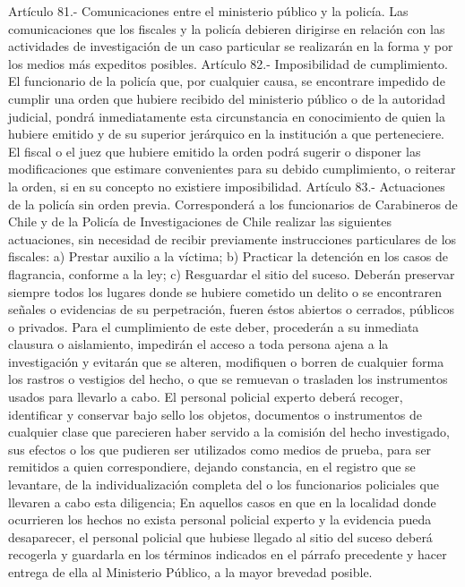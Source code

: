     Artículo 81.- Comunicaciones entre el ministerio público y la policía. Las comunicaciones que los fiscales y la policía debieren dirigirse en relación con las actividades de investigación de un caso particular se realizarán en la forma y por los medios más expeditos posibles.
    Artículo 82.- Imposibilidad de cumplimiento. El funcionario de la policía que, por cualquier causa, se encontrare impedido de cumplir una orden que hubiere recibido del ministerio público o de la autoridad judicial, pondrá inmediatamente esta circunstancia en conocimiento de quien la hubiere emitido y de su superior jerárquico en la institución a que perteneciere.
    El fiscal o el juez que hubiere emitido la orden podrá sugerir o disponer las modificaciones que estimare convenientes para su debido cumplimiento, o reiterar la orden, si en su concepto no existiere imposibilidad.
    Artículo 83.- Actuaciones de la policía sin orden previa. Corresponderá a los funcionarios de Carabineros de Chile y de la Policía de Investigaciones de Chile realizar las siguientes actuaciones, sin necesidad de recibir previamente instrucciones particulares de los fiscales:
    a) Prestar auxilio a la víctima;
    b) Practicar la detención en los casos de flagrancia, conforme a la ley;
    c) Resguardar el sitio del suceso. Deberán preservar siempre todos los lugares donde se hubiere cometido un delito o se encontraren señales o evidencias de su perpetración, fueren éstos abiertos o cerrados, públicos o privados. Para el cumplimiento de este deber, procederán a su inmediata clausura o aislamiento, impedirán el acceso a toda persona ajena a la investigación y evitarán que se alteren, modifiquen o borren de cualquier forma los rastros o vestigios del hecho, o que se remuevan o trasladen los instrumentos usados para llevarlo a cabo.
    El personal policial experto deberá recoger, identificar y conservar bajo sello los objetos, documentos o instrumentos de cualquier clase que parecieren haber servido a la comisión del hecho investigado, sus efectos o los que pudieren ser utilizados como medios de prueba, para ser remitidos a quien correspondiere, dejando constancia, en el registro que se levantare, de la individualización completa del o los funcionarios policiales que llevaren a cabo esta diligencia;
    En aquellos casos en que en la localidad donde ocurrieren los hechos no exista personal policial experto y la evidencia pueda desaparecer, el personal policial que hubiese llegado al sitio del suceso deberá recogerla y guardarla en los términos indicados en el párrafo precedente y hacer entrega de ella al Ministerio Público, a la mayor brevedad posible.
